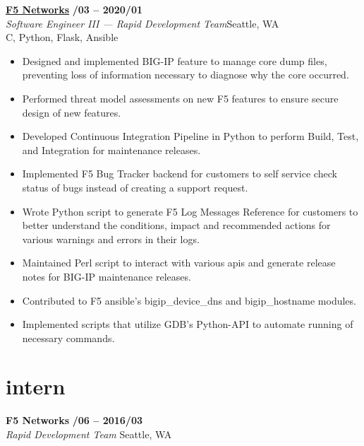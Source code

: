 \documentclass[margin,10pt]{res}
\begin{document}
\begin{resume}
    \href{https://www.f5.com/}{\textbf{F5 Networks}} \hfill \textsc{\bfseries{}/03 -- 2020/01}\\
    \textit{Software Engineer III --- Rapid Development Team}\hfill Seattle, WA\\
    C, Python, Flask, Ansible
    \begin{itemize}
        \item Designed and implemented BIG-IP feature to manage core dump files, preventing loss of information necessary to
        diagnose why the core occurred.
        \item Performed threat model assessments on new F5 features to ensure secure design of new features.
        \item Developed Continuous Integration Pipeline in Python to perform Build, Test, and Integration for maintenance releases.
        \item Implemented F5 Bug Tracker backend for customers to self service check status of bugs instead of creating a support
        request.
        \item Wrote Python script to generate F5 Log Messages Reference for customers to better understand the conditions, impact
        and recommended actions for various warnings and errors in their logs.
        \item Maintained Perl script to interact with various apis and generate release notes for BIG-IP maintenance releases.
        \item Contributed to F5 ansible's bigip\_device\_dns and bigip\_hostname modules.
        \item Implemented scripts that utilize GDB's Python-API to automate running of necessary commands.
    \end{itemize}
\section{\sc \lsstyle intern}
    \textbf{F5 Networks} \hfill \textsc{\bfseries{}/06 -- 2016/03}\\
    \textit{Rapid Development Team} \hfill Seattle, WA


\end{resume}
\end{document}
